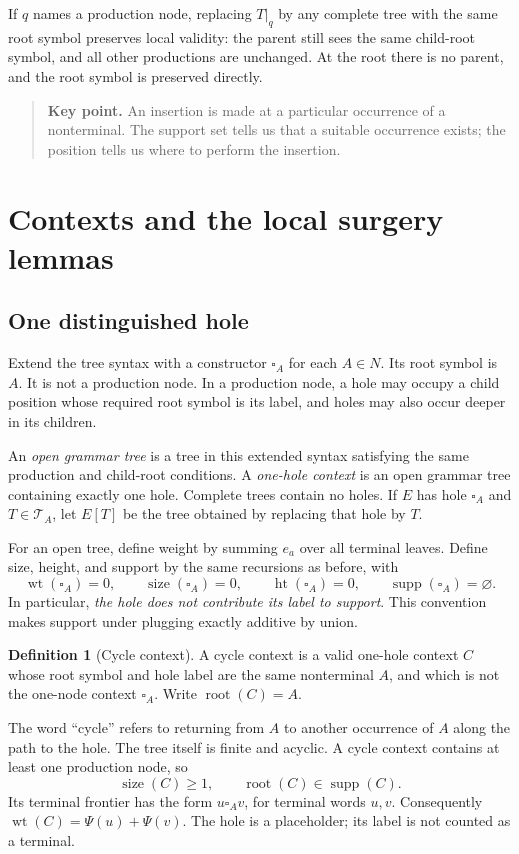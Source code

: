 \documentclass[11pt,a4paper]{article}
\numberwithin{equation}{section}
\theoremstyle{plain}
\theoremstyle{definition}
\newtheorem{definition}[theorem]{Definition}
\theoremstyle{remark}
\newcommand{\wt}{\operatorname{wt}}
\newcommand{\supp}{\operatorname{supp}}
\newcommand{\rt}{\operatorname{root}}
\newcommand{\treeheight}{\operatorname{ht}}
\newcommand{\sz}{\operatorname{size}}
\newcommand{\Trees}{\mathcal T}
\newcommand{\hole}[1]{\square_{#1}}
\newcommand{\key}[1]{\begin{quote}\small\color{ink}\textbf{Key point.} #1\end{quote}}
\begin{document}
If $q$ names a production node, replacing $T|_q$ by any complete tree with the same root symbol preserves local validity: the parent still sees the same child-root symbol, and all other productions are unchanged. At the root there is no parent, and the root symbol is preserved directly.

\key{An insertion is made at a particular occurrence of a nonterminal. The support set tells us that a suitable occurrence exists; the position tells us where to perform the insertion.}

\section{Contexts and the local surgery lemmas}\label{sec:contexts}

\subsection{One distinguished hole}
Extend the tree syntax with a constructor $\hole{A}$ for each $A\in N$. Its root symbol is $A$. It is not a production node. In a production node, a hole may occupy a child position whose required root symbol is its label, and holes may also occur deeper in its children.

An \emph{open grammar tree} is a tree in this extended syntax satisfying the same production and child-root conditions. A \emph{one-hole context} is an open grammar tree containing exactly one hole. Complete trees contain no holes. If $E$ has hole $\hole{A}$ and $T\in\Trees_A$, let $E[T]$ be the tree obtained by replacing that hole by $T$.

For an open tree, define weight by summing $e_a$ over all terminal leaves. Define size, height, and support by the same recursions as before, with
\[
\wt(\hole{A})=0,\qquad\sz(\hole{A})=0,\qquad
\treeheight(\hole{A})=0,\qquad\supp(\hole{A})=\varnothing.
\]
In particular, \emph{the hole does not contribute its label to support}. This convention makes support under plugging exactly additive by union.

\begin{definition}[Cycle context]\label{def:cycle}
A cycle context is a valid one-hole context $C$ whose root symbol and hole label are the same nonterminal $A$, and which is not the one-node context $\hole{A}$. Write $\rt(C)=A$.
\end{definition}

The word ``cycle'' refers to returning from $A$ to another occurrence of $A$ along the path to the hole. The tree itself is finite and acyclic. A cycle context contains at least one production node, so
\begin{equation}\label{eq:cycle-root}
\sz(C)\geq1,\qquad \rt(C)\in\supp(C).
\end{equation}
Its terminal frontier has the form $u\hole{A}v$, for terminal words $u,v$. Consequently $\wt(C)=\Psi(u)+\Psi(v)$. The hole is a placeholder; its label is not counted as a terminal.
\end{document}
